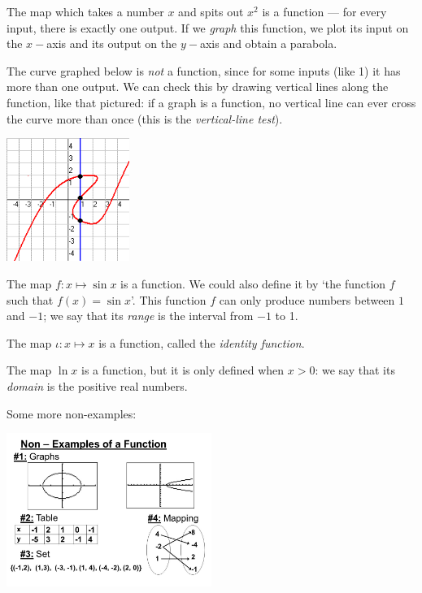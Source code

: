 \begin{ex}
  The map which takes a number $ x $ and spits out $ x^2 $ is a function --- for every input, there is exactly one output. If
  we \textit{graph} this function, we plot its input on the $ x-$axis and its output on the $ y-$axis and obtain a parabola.
\end{ex}

\begin{ex}
  The curve graphed below is \textit{not} a function, since for some inputs (like 1) it has more than one output. We can check this
  by drawing vertical lines along the function, like that pictured: if a graph is a function, no vertical line can ever cross the curve
  more than once (this is the \textit{vertical-line test}).

  \begin{center}
    \includegraphics[width=0.3\textwidth]{linetest}
  \end{center}
\end{ex}

\begin{ex}
  The map $ f : x \mapsto \sin x $ is a function. We could also define it by `the function $ f $ such that $ f(x) = \sin x $'.
  This function $ f $ can only produce numbers between $1$ and $-1$; we say that its \textit{range} is the interval from $ -1 $ to 1.
\end{ex}

\begin{ex}
  The map $ \iota : x \mapsto x $ is a function, called the \textit{identity function}.
\end{ex}

\begin{ex}
  The map $ \ln x $ is a function, but it is only defined when $ x > 0 $: we say that its \textit{domain} is the positive real numbers.
\end{ex}

\clearpage
\begin{ex}
  Some more non-examples:

  \begin{center}
    \includegraphics[width=0.5\textwidth]{notfunction}
  \end{center}
\end{ex}

